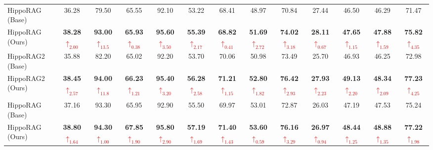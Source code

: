 \documentclass[11pt]{article}
\begin{document}
\begin{table}[!ht]
{\begin{NiceTabular}{@{}l|cc|cc|cc|cc|cc|cc@{}}
 \\
\midrule
HippoRAG (Base)   & 36.28 & 79.50 & 65.55 & 92.10 & 53.22 & 68.41 & 48.97 & 70.84 & 27.44 & 46.50 & 46.29 & 71.47 \\
HippoRAG (Ours)   & \textbf{38.28}\textcolor{red}{$\uparrow_{2.00}$} & \textbf{93.00}\textcolor{red}{$\uparrow_{13.5}$} & \textbf{65.93}\textcolor{red}{$\uparrow_{0.38}$} & \textbf{95.60}\textcolor{red}{$\uparrow_{3.50}$} & \textbf{55.39}\textcolor{red}{$\uparrow_{2.17}$} & \textbf{68.82}\textcolor{red}{$\uparrow_{0.41}$} & \textbf{51.69}\textcolor{red}{$\uparrow_{2.72}$} & \textbf{74.02}\textcolor{red}{$\uparrow_{3.18}$} & \textbf{28.11}\textcolor{red}{$\uparrow_{0.67}$} & \textbf{47.65}\textcolor{red}{$\uparrow_{1.15}$} & \textbf{47.88}\textcolor{red}{$\uparrow_{1.59}$} & \textbf{75.82}\textcolor{red}{$\uparrow_{4.35}$} \\
HippoRAG2 (Base)  & 35.88 & 82.20 & 65.02 & 92.20 & 53.70 & 70.06 & 50.98 & 73.49 & 25.70 & 46.93 & 46.25 & 72.98 \\
HippoRAG2 (Ours)  & \textbf{38.45}\textcolor{red}{$\uparrow_{2.57}$} & \textbf{94.00}\textcolor{red}{$\uparrow_{11.8}$} & \textbf{66.23}\textcolor{red}{$\uparrow_{1.21}$} & \textbf{95.40}\textcolor{red}{$\uparrow_{3.20}$} & \textbf{56.28}\textcolor{red}{$\uparrow_{2.58}$} & \textbf{71.21}\textcolor{red}{$\uparrow_{1.15}$} & \textbf{52.80}\textcolor{red}{$\uparrow_{1.82}$} & \textbf{76.42}\textcolor{red}{$\uparrow_{2.93}$} & \textbf{27.93}\textcolor{red}{$\uparrow_{2.23}$} & \textbf{49.13}\textcolor{red}{$\uparrow_{2.20}$} & \textbf{48.34}\textcolor{red}{$\uparrow_{2.09}$} & \textbf{77.23}\textcolor{red}{$\uparrow_{4.25}$} \\
\midrule
{} \\
\midrule
HippoRAG (Base)   & 37.16 & 93.30 & 65.95 & 92.90 & 55.50 & 69.97 & 53.01 & 72.87 & 26.03 & 47.19 & 47.53 & 75.24 \\
HippoRAG (Ours)   & \textbf{38.80}\textcolor{red}{$\uparrow_{1.64}$} & \textbf{94.30}\textcolor{red}{$\uparrow_{1.00}$} & \textbf{67.85}\textcolor{red}{$\uparrow_{1.90}$} & \textbf{95.80}\textcolor{red}{$\uparrow_{2.90}$} & \textbf{57.19}\textcolor{red}{$\uparrow_{1.69}$} & \textbf{71.40}\textcolor{red}{$\uparrow_{1.43}$} & \textbf{53.60}\textcolor{red}{$\uparrow_{0.59}$} & \textbf{76.16}\textcolor{red}{$\uparrow_{3.29}$} & \textbf{26.97}\textcolor{red}{$\uparrow_{0.94}$} & \textbf{48.44}\textcolor{red}{$\uparrow_{1.25}$} & \textbf{48.88}\textcolor{red}{$\uparrow_{1.35}$} & \textbf{77.22}\textcolor{red}{$\uparrow_{1.98}$} \\

\end{NiceTabular}}
\end{table}
\end{document}
